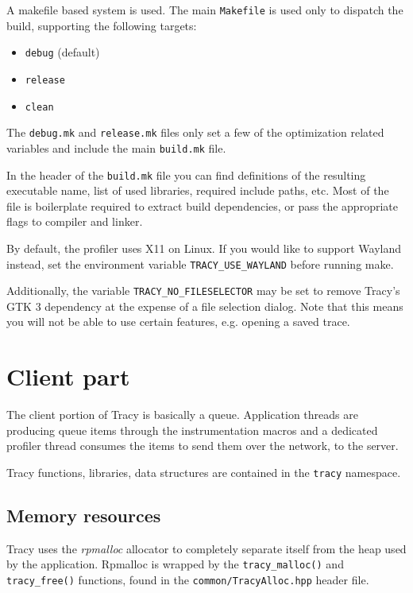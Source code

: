 \documentclass[hidelinks,titlepage,a4paper]{article}
\begin{document}
A makefile based system is used. The main \texttt{Makefile} is used only to dispatch the build, supporting the following targets:

\begin{itemize}
\item \texttt{debug} (default)
\item \texttt{release}
\item \texttt{clean}
\end{itemize}

The \texttt{debug.mk} and \texttt{release.mk} files only set a few of the optimization related variables and include the main \texttt{build.mk} file.

In the header of the \texttt{build.mk} file you can find definitions of the resulting executable name, list of used libraries, required include paths, etc. Most of the file is boilerplate required to extract build dependencies, or pass the appropriate flags to compiler and linker.

By default, the profiler uses X11 on Linux.  If you would like to support Wayland instead, set the environment variable \texttt{TRACY\_USE\_WAYLAND} before running make.

Additionally, the variable \texttt{TRACY\_NO\_FILESELECTOR} may be set to remove Tracy's GTK 3 dependency at the expense of a file selection dialog.  Note that this means you will not be able to use certain features, e.g. opening a saved trace.

\section{Client part}

The client portion of Tracy is basically a queue. Application threads are producing queue items through the instrumentation macros and a dedicated profiler thread consumes the items to send them over the network, to the server.

Tracy functions, libraries, data structures are contained in the \texttt{tracy} namespace.

\subsection{Memory resources}

Tracy uses the \emph{rpmalloc} allocator to completely separate itself from the heap used by the application. Rpmalloc is wrapped by the \texttt{tracy\_malloc()} and \texttt{tracy\_free()} functions, found in the \texttt{common/TracyAlloc.hpp} header file.
\end{document}
